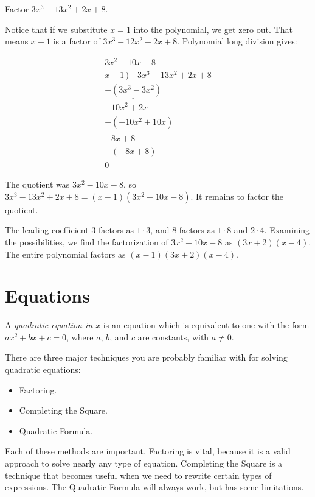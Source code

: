 \documentclass{ximera}
\begin{document}
\begin{example}
	Factor $3x^3-13x^2+2x+8$.
	\begin{explanation}
		Notice that if we substitute $x=1$ into the polynomial, we get zero out.  That means $x-1$ is a factor of $3x^3-12x^2+2x+8$.
		Polynomial long division gives:

\[
\begin{array}{r}
3x^2-10x-8 \\[2pt]
x-1\,\overline{)\quad 3x^3-13x^2+2x+8} \\[4pt]
\underline{-(3x^3-3x^2)}
    \phantom{{}+2x+8} \\
-10x^2+2x
    \phantom{-()+8} \\
\underline{-(-10x^2+10x)}
    \phantom{{}+8} \\
-8x+8
    \phantom{-()} \\
\underline{-(-8x+8)} \\
0
\end{array}
\]

		
		The quotient was $3x^2-10x-8$, so $3x^3-13x^2+2x+8 = (x-1)(3x^2-10x-8)$.  It remains to factor the quotient.
		
		The leading coefficient $3$ factors as $1 \cdot 3$, and $8$ factors as $1 \cdot 8$ and $2 \cdot 4$.  Examining the possibilities, we find the factorization
		of $3x^2-10x-8$ as $(3x+2)(x-4)$.  The entire polynomial factors as $(x-1)(3x+2)(x-4)$.
	\end{explanation}
\end{example}



\section{Equations}
A \emph{quadratic equation in $x$} is an equation which is equivalent to one with the form
	$ax^2 + bx + c = 0$, where $a$, $b$, and $c$ are constants, with $a \neq 0$.

There are three major techniques you are probably familiar with for solving quadratic equations:
\begin{itemize}
	\item Factoring.
	\item Completing the Square.
	\item Quadratic Formula.
\end{itemize}

Each of these methods are important.  Factoring is vital, because it is a valid approach to solve nearly any type of equation.  Completing
the Square is a technique that becomes useful when we need to rewrite certain types of expressions.  The Quadratic Formula will always
work, but has some limitations.
\end{document}
